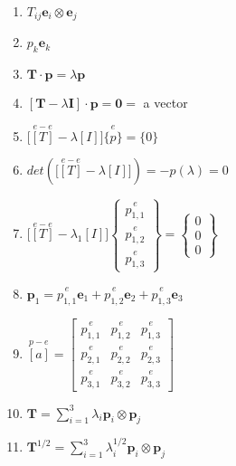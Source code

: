 \documentclass[10pt, letterpaper]{article}
\begin{document}
\begin{enumerate}
  \item $T_{ij} \bm{e}_i \otimes \bm{e}_j$
  \item $p_k \bm{e}_k$
  \item $\bm{T} \cdot \bm{p} = \lambda \bm{p}$
  \item$[\bm{T} - \lambda \bm{I}]\cdot \bm{p} = \bm{0} =$ a  vector
  \item$\big[ \overset{e-e}{[T]} - \lambda [I] \big]\overset{e}{\{p\}} = \{0\}$
  \item $det\left( \big[ \overset{e-e}{[T]} - \lambda [I] \big] \right) = -p(\lambda) = 0$
    \item$\big[ \overset{e-e}{[T]} - \lambda_1 [I] \big] \begin{Bmatrix} \overset{e}{p_{1,1}} \\ \overset{e}{p_{1,2}} \\ \overset{e}{p_{1,3}} \end{Bmatrix} = \begin{Bmatrix} 0\\0\\0 \end{Bmatrix}$
    \item $\bm{p}_1 = \overset{e}{p_{1,1}} \bm{e}_1 + \overset{e}{p_{1,2}} \bm{e}_2 + \overset{e}{p_{1,3}} \bm{e}_3$
    \item $\overset{p-e}{[a]} = \begin{bmatrix}  \overset{e}{p_{1,1}} &  \overset{e}{p_{1,2}}  &  \overset{e}{p_{1,3}} \\
                                                                        \overset{e}{p_{2,1}} &  \overset{e}{p_{2,2}}  &  \overset{e}{p_{2,3}} \\ 
                                                                        \overset{e}{p_{3,1}} &  \overset{e}{p_{3,2}}  &  \overset{e}{p_{3,3}} \end{bmatrix}$
  \item $\bm{T} = \sum_{i=1}^{3} \lambda_i \bm{p}_i \otimes \bm{p}_j$
  \item $\bm{T}^{1/2} = \sum_{i=1}^{3} \lambda_i^{1/2} \bm{p}_i \otimes \bm{p}_j$
 \end{enumerate}
\end{document}
